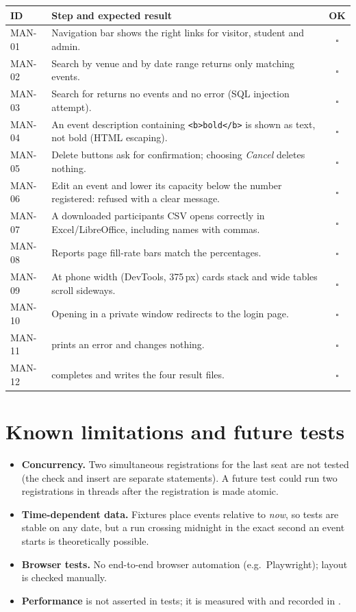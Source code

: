 \documentclass[11pt,a4paper]{article}
\begin{document}
\begin{xltabular}{\linewidth}{@{}l X c@{}}
\toprule
\textbf{ID} & \textbf{Step and expected result} & \textbf{OK} \\
\midrule
\endhead
MAN-01 & Navigation bar shows the right links for visitor, student and admin. & $\square$ \\
MAN-02 & Search by venue and by date range returns only matching events. & $\square$ \\
MAN-03 & Search for  returns no events and no error (SQL injection attempt). & $\square$ \\
MAN-04 & An event description containing \texttt{<b>bold</b>} is shown as text, not bold (HTML escaping). & $\square$ \\
MAN-05 & Delete buttons ask for confirmation; choosing \emph{Cancel} deletes nothing. & $\square$ \\
MAN-06 & Edit an event and lower its capacity below the number registered: refused with a clear message. & $\square$ \\
MAN-07 & A downloaded participants CSV opens correctly in Excel/LibreOffice, including names with commas. & $\square$ \\
MAN-08 & Reports page fill-rate bars match the percentages. & $\square$ \\
MAN-09 & At phone width (DevTools, 375\,px) cards stack and wide tables scroll sideways. & $\square$ \\
MAN-10 & Opening  in a private window redirects to the login page. & $\square$ \\
MAN-11 &  prints an error and changes nothing. & $\square$ \\
MAN-12 &  completes and writes the four result files. & $\square$ \\
\bottomrule
\end{xltabular}

\section{Known limitations and future tests}

\begin{itemize}
  \item \textbf{Concurrency.} Two simultaneous registrations for the last seat are not tested (the
        check and insert are separate statements). A future test could run two registrations in
        threads after the registration is made atomic.
  \item \textbf{Time-dependent data.} Fixtures place events relative to \emph{now}, so tests are
        stable on any date, but a run crossing midnight in the exact second an event starts is
        theoretically possible.
  \item \textbf{Browser tests.} No end-to-end browser automation (e.g.\ Playwright); layout is
        checked manually.
  \item \textbf{Performance} is not asserted in tests; it is measured with  and
        recorded in .
\end{itemize}
\end{document}
